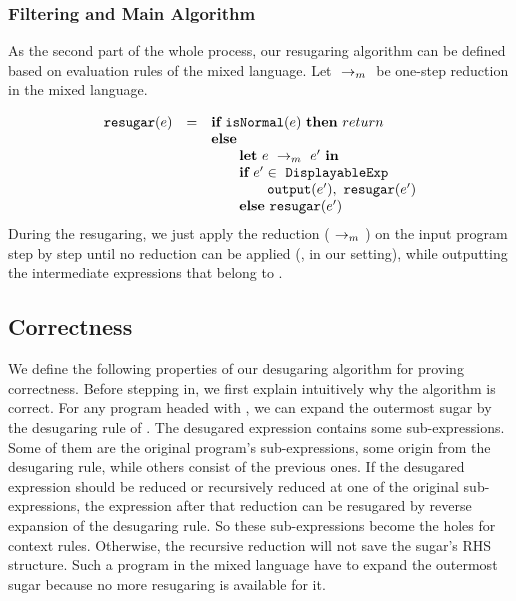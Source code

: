 
\subsubsection{Filtering and Main Algorithm}

As the second part of the whole process, our resugaring algorithm can be defined based on evaluation rules of the mixed language. Let $~\rightarrow_m~$ be one-step reduction in the mixed language.

\[
\begin{array}{llll}
\mbox{\tt resugar} (e) &=& \mbox{\rm \bf if}~\mbox{\tt isNormal}(e)~\mbox{\rm \bf then}~return\\
              & & \mbox{\rm \bf else}~\\
							& & \qquad \mbox{\rm \bf let}~e ~\rightarrow_m~e'~\mbox{\rm \bf in}\\
							& & \qquad \mbox{\rm \bf if}~e' \in~\mbox{\tt DisplayableExp} \\
							& & \qquad \qquad \mbox{\tt output}(e'),~\mbox{\tt resugar}(e')\\
							& & \qquad \mbox{\rm \bf else}~\mbox{\tt resugar}(e')
\end{array}
\]
During the resugaring, we just apply the reduction ($~\rightarrow_m~$) on the input program step by step until no reduction can be applied (,  in our setting), while outputting the intermediate expressions that belong to .


\subsection{Correctness}
\label{mark:correct}


We define the following properties of our desugaring algorithm for proving correctness. Before stepping in, we first explain intuitively why the algorithm is correct. For any program headed with , we can expand the outermost sugar by the desugaring rule of . The desugared expression contains some sub-expressions. Some of them are the original program's sub-expressions, some origin from the desugaring rule, while others consist of the previous ones. If the desugared expression should be reduced or recursively reduced at one of the original sub-expressions, the expression after that reduction can be resugared by reverse expansion of the desugaring rule. So these sub-expressions become the holes for context rules. Otherwise, the recursive reduction will not save the sugar's RHS structure. Such a program in the mixed language have to expand the outermost sugar because no more resugaring is available for it.




